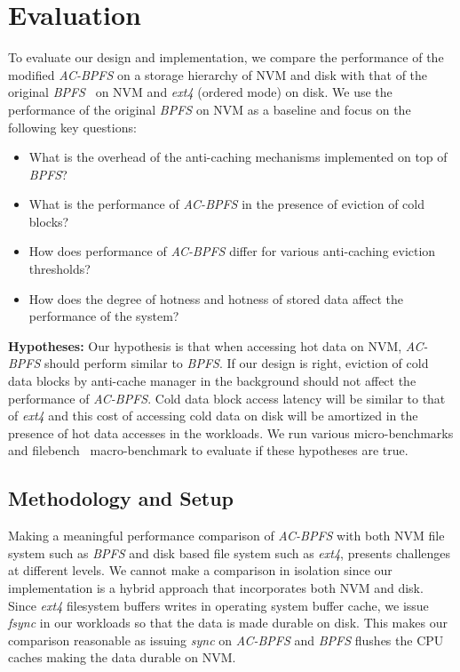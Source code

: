 \section{Evaluation}
To evaluate our design and implementation, we compare the performance of the modified \textit{AC-BPFS} on a storage hierarchy of NVM and disk with that of the original \textit{BPFS}~\cite{c10} on NVM and \textit{ext4} (ordered mode) on disk. We use the performance of the original \textit{BPFS} on NVM as a baseline and focus on the following key questions:

\begin{itemize}
\item What is the overhead of the anti-caching mechanisms implemented on top of \textit{BPFS}? \vspace{-0.1in}
\item What is the performance of \textit{AC-BPFS} in the presence of eviction of cold blocks? \vspace{-0.1in}
\item How does performance of \textit{AC-BPFS} differ for various anti-caching eviction thresholds? \vspace{-0.1in}
\item How does the degree of hotness and hotness of stored data affect the performance of the system? \vspace{-0.1in}
\end{itemize}

\textbf{Hypotheses:} Our hypothesis is that when accessing hot data on NVM, \textit{AC-BPFS} should perform similar to \textit{BPFS}. If our design is right, eviction of cold data blocks by anti-cache manager in the background should not affect the performance of \textit{AC-BPFS}. Cold data block access latency will be similar to that of \textit{ext4} and this cost of accessing cold data on disk will be amortized in the presence of hot data accesses in the workloads. We run various micro-benchmarks and filebench~\cite{filebench} macro-benchmark to evaluate if these hypotheses are true.

\subsection{Methodology and Setup}
Making a meaningful performance comparison of \textit{AC-BPFS} with both NVM file system such as \textit{BPFS} and disk based file system such as \textit{ext4}, presents challenges at different levels. We cannot make a comparison in isolation since our implementation is a hybrid approach that incorporates both NVM and disk. Since \textit{ext4} filesystem buffers writes in operating system buffer cache, we issue \textit{fsync} in our workloads so that the data is made durable on disk. This makes our comparison reasonable as issuing \textit{sync} on \textit{AC-BPFS} and \textit{BPFS} flushes the CPU caches making the data durable on NVM. 

